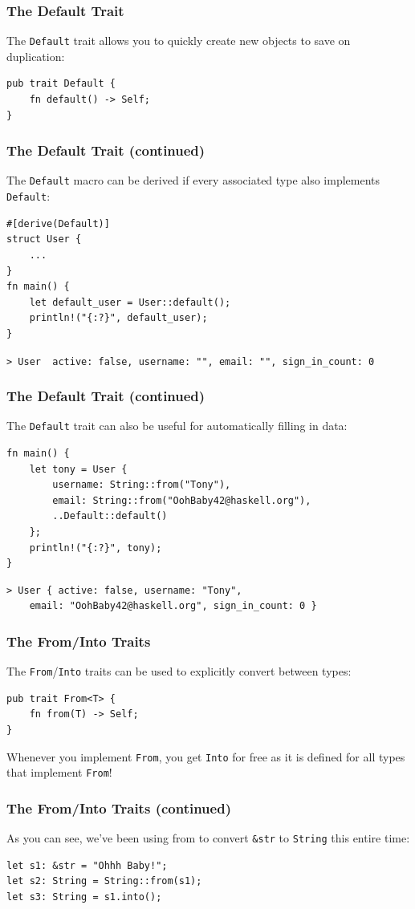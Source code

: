 \documentclass{slides}
\begin{document}
\begin{frame}[fragile]
\frametitle{The Default Trait}
The \texttt{Default} trait allows you to quickly create new objects to save on duplication:
\begin{verbatim}
pub trait Default {
    fn default() -> Self;
}
\end{verbatim}
\end{frame}

\begin{frame}[fragile]
\frametitle{The Default Trait (continued)}
The \texttt{Default} macro can be derived if every associated type also implements \texttt{Default}:
\begin{verbatim}
#[derive(Default)]
struct User {
    ...
}
fn main() {
    let default_user = User::default();
    println!("{:?}", default_user);
}
\end{verbatim}
\texttt{> User { active: false, username: "", email: "", sign_in_count: 0 }}
\end{frame}

\begin{frame}[fragile]
\frametitle{The Default Trait (continued)}
The \texttt{Default} trait can also be useful for automatically filling in data:
\begin{verbatim}
fn main() {
    let tony = User {
        username: String::from("Tony"),
        email: String::from("OohBaby42@haskell.org"),
        ..Default::default()
    };
    println!("{:?}", tony);
}
\end{verbatim}
\begin{verbatim}
> User { active: false, username: "Tony", 
    email: "OohBaby42@haskell.org", sign_in_count: 0 }
\end{verbatim}
\end{frame}


\begin{frame}[fragile]
\frametitle{The From/Into Traits}
The \texttt{From}/\texttt{Into} traits can be used to explicitly convert between types:
\begin{verbatim}
pub trait From<T> {
    fn from(T) -> Self;
}
\end{verbatim}
Whenever you implement \texttt{From}, you get \texttt{Into} for free as it is defined for all types that implement \texttt{From}!
\end{frame}

\begin{frame}[fragile]
\frametitle{The From/Into Traits (continued)}
As you can see, we've been using from to convert \texttt{&str} to \texttt{String} this entire time:
\begin{verbatim}
let s1: &str = "Ohhh Baby!";
let s2: String = String::from(s1);
let s3: String = s1.into();
\end{verbatim}
\end{frame}
\end{document}
